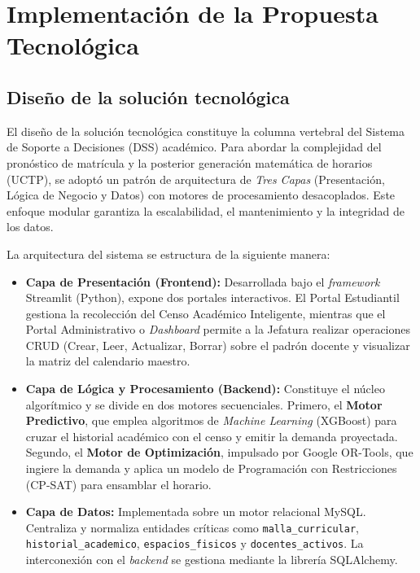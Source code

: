 \chapter{Implementación de la Propuesta Tecnológica}
\label{ch:implementacion}

\insertminitoc
\parindent0pt

\section{Diseño de la solución tecnológica}
El diseño de la solución tecnológica constituye la columna vertebral del Sistema de Soporte a Decisiones (DSS) académico. Para abordar la complejidad del pronóstico de matrícula y la posterior generación matemática de horarios (UCTP), se adoptó un patrón de arquitectura de \textit{Tres Capas} (Presentación, Lógica de Negocio y Datos) con motores de procesamiento desacoplados. Este enfoque modular garantiza la escalabilidad, el mantenimiento y la integridad de los datos.

La arquitectura del sistema se estructura de la siguiente manera:
\begin{itemize}
    \item \textbf{Capa de Presentación (Frontend):} Desarrollada bajo el \textit{framework} Streamlit (Python), expone dos portales interactivos. El Portal Estudiantil gestiona la recolección del Censo Académico Inteligente, mientras que el Portal Administrativo o \textit{Dashboard} permite a la Jefatura realizar operaciones CRUD (Crear, Leer, Actualizar, Borrar) sobre el padrón docente y visualizar la matriz del calendario maestro.
    \item \textbf{Capa de Lógica y Procesamiento (Backend):} Constituye el núcleo algorítmico y se divide en dos motores secuenciales. Primero, el \textbf{Motor Predictivo}, que emplea algoritmos de \textit{Machine Learning} (XGBoost) para cruzar el historial académico con el censo y emitir la demanda proyectada. Segundo, el \textbf{Motor de Optimización}, impulsado por Google OR-Tools, que ingiere la demanda y aplica un modelo de Programación con Restricciones (CP-SAT) para ensamblar el horario.
    \item \textbf{Capa de Datos:} Implementada sobre un motor relacional MySQL. Centraliza y normaliza entidades críticas como \texttt{malla\_curricular}, \texttt{historial\_academico}, \texttt{espacios\_fisicos} y \texttt{docentes\_activos}. La interconexión con el \textit{backend} se gestiona mediante la librería SQLAlchemy.
\end{itemize}


